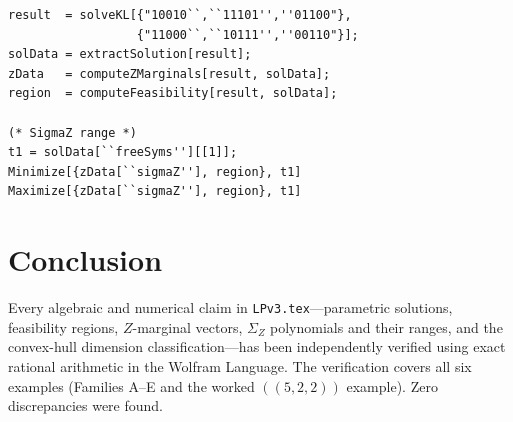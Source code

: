 \documentclass{article}
\newcommand{\SigZ}{\Sigma_Z}
\begin{document}
\begin{lstlisting}
result  = solveKL[{"10010``,``11101'',''01100"},
                  {"11000``,``10111'',''00110"}];
solData = extractSolution[result];
zData   = computeZMarginals[result, solData];
region  = computeFeasibility[result, solData];

(* SigmaZ range *)
t1 = solData[``freeSyms''][[1]];
Minimize[{zData[``sigmaZ''], region}, t1]
Maximize[{zData[``sigmaZ''], region}, t1]
\end{lstlisting}

\section*{Conclusion}

Every algebraic and numerical claim in \texttt{LPv3.tex}---parametric solutions, feasibility regions, $Z$-marginal vectors, $\SigZ$ polynomials and their ranges, and the convex-hull dimension classification---has been independently verified using exact rational arithmetic in the Wolfram Language.
The verification covers all six examples (Families A--E and the worked $((5,2,2))$ example).
Zero discrepancies were found.
\end{document}

